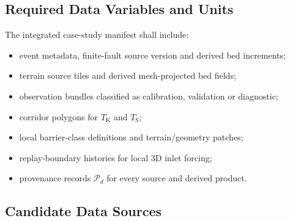 \subsection{Required Data Variables and Units}
\label{sec:res-dat-cas-required-data-variables-units}

The integrated case-study manifest shall include:

\begin{itemize}
  \item event metadata, finite-fault source version and derived bed
    increments;
  \item terrain source tiles and derived mesh-projected bed fields;
  \item observation bundles classified as calibration, validation or
    diagnostic;
  \item corridor polygons for $T_{\mathrm{K}}$ and $T_{\mathrm{S}}$;
  \item local barrier-class definitions and terrain/geometry patches;
  \item replay-boundary histories for local 3D inlet forcing;
  \item provenance records \(\mathcal{P}_d\) for every source and
    derived product.
\end{itemize}

\subsection{Candidate Data Sources}
\label{sec:res-dat-cas-candidate-data-sources}

